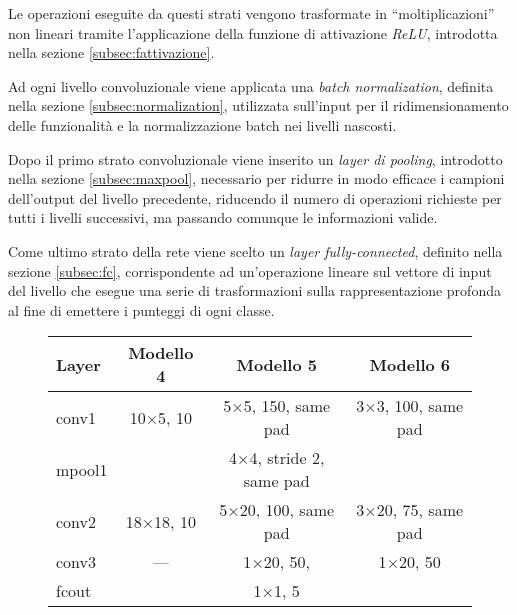 Le operazioni eseguite da questi strati vengono trasformate in ``moltiplicazioni'' non lineari tramite l'applicazione della funzione di attivazione \emph{ReLU}, introdotta nella sezione \ref{subsec:fattivazione}.

Ad ogni livello convoluzionale viene applicata una \emph{batch normalization}, definita nella sezione \ref{subsec:normalization}, utilizzata sull'input per il ridimensionamento delle funzionalità e la normalizzazione batch nei livelli nascosti.

Dopo il primo strato convoluzionale viene inserito un \emph{layer di pooling}, introdotto nella sezione \ref{subsec:maxpool}, necessario per ridurre in modo efficace i campioni dell'output del livello precedente, riducendo il numero di operazioni richieste per tutti i livelli successivi, ma passando comunque le informazioni valide.

Come ultimo strato della rete viene scelto un \emph{layer fully-connected}, definito nella sezione \ref{subsec:fc}, corrispondente ad un'operazione lineare sul vettore di input del livello che esegue una serie di trasformazioni sulla rappresentazione profonda al fine di emettere i punteggi di ogni classe.

\begin{figure}[H]
	\centering
	\begin{tabular}{lccc}
		\toprule
		\textbf{Layer}& \textbf{Modello 4} & \textbf{Modello 5} & \textbf{Modello 6} 		\\ 
		\midrule
		conv1 	& \num{10}$\times$\num{5}, 10	  & \num{5}$\times$\num{5}, 150, same pad    &\num{3}$\times$\num{3}, 100, same pad 		   \\
		
		mpool1 	& &{\num{4}$\times$\num{4}, stride 2, same pad}	&   \\
		conv2  	& \num{18}$\times$\num{18}, 10	  &  \num{5}$\times$\num{20}, 100, same pad	  &		\num{3}$\times$\num{20}, 75, same pad    \\
		conv3  	& ---	  & \num{1}$\times$\num{20}, 50, 	   &	\num{1}$\times$\num{20}, 50 	   \\
		fcout		& &{\num{1}$\times$\num{1}, 5}&		   \\
		
		\bottomrule	
	\end{tabular}
	\label{tab:netemb1}
\end{figure}

